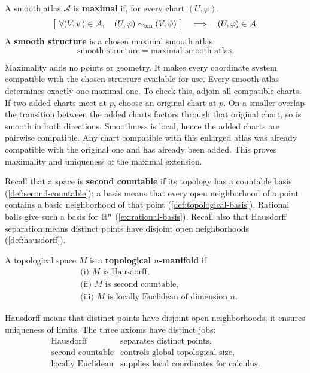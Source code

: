 \begin{definition}
A smooth atlas $\mathcal A$ is \textbf{maximal} if, for every chart $(U,\varphi)$,
\[
\bigl[\ \forall(V,\psi)\in\mathcal A,\quad
(U,\varphi)\sim_{\rm sm}(V,\psi)\ \bigr]
\quad\Longrightarrow\quad(U,\varphi)\in\mathcal A.
\]
A \textbf{smooth structure} is a chosen maximal smooth atlas:
\[
\boxed{\text{smooth structure}=\text{maximal smooth atlas}.}
\]
\end{definition}
Maximality adds no points or geometry. It makes every coordinate system
compatible with the chosen structure available for use.
Every smooth atlas determines exactly one maximal one. To check this,
adjoin all compatible charts. If two added charts meet at $p$, choose
an original chart at $p$. On a smaller overlap the transition between
the added charts factors through that original chart, so is smooth in
both directions. Smoothness is local, hence the added charts are
pairwise compatible. Any chart compatible with this enlarged atlas was
already compatible with the original one and has already been added.
This proves maximality and uniqueness of the maximal extension.

Recall that a space is \textbf{second countable} if its topology has a
countable basis (\cref{def:second-countable}); a basis means that every
open neighborhood of a point contains a basic neighborhood of that point
(\cref{def:topological-basis}). Rational balls give such a basis for
$\mathbb{R}^n$ (\cref{ex:rational-basis}). Recall also that Hausdorff separation
means distinct points have disjoint open neighborhoods
(\cref{def:hausdorff}).
\begin{definition}
A topological space $M$ is a \textbf{topological $n$-manifold} if
\[
\begin{aligned}
&\text{(i) }M\text{ is Hausdorff},\\
&\text{(ii) }M\text{ is second countable},\\
&\text{(iii) }M\text{ is locally Euclidean of dimension }n.
\end{aligned}
\]
\end{definition}
Hausdorff means that distinct points have disjoint open neighborhoods;
it ensures uniqueness of limits. The three axioms have distinct jobs:
\[
\begin{array}{ll}
\text{Hausdorff}&\text{separates distinct points},\\
\text{second countable}&\text{controls global topological size},\\
\text{locally Euclidean}&\text{supplies local coordinates for calculus}.
\end{array}
\]


